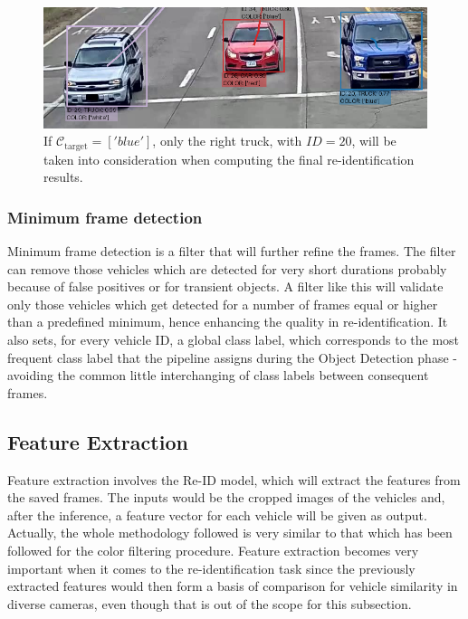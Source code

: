 \begin{figure}[H]
    \centering
    \includegraphics[width=1.0\textwidth]{images/ColorFiltering.png}
    \caption[Color Filtering]{If \(\mathcal{C}_{\text{target}} = ['blue']\), only the right truck, with \(ID = 20\), will be taken into consideration when computing the final re-identification results.}
    \label{fig:ColorFiltering}
\end{figure}

\subsubsection{Minimum frame detection}
Minimum frame detection is a filter that will further refine the frames. The filter can remove those vehicles which are detected for very short durations probably because of false positives or for transient objects. A filter like this will validate only those vehicles which get detected for a number of frames equal or higher than a predefined minimum, hence enhancing the quality in re-identification. It also sets, for every vehicle ID, a global class label, which corresponds to the most frequent class label that the pipeline assigns during the Object Detection phase - avoiding the common little interchanging of class labels between consequent frames.

\subsection{Feature Extraction}
Feature extraction involves the Re-ID model, which will extract the features from the saved frames. The inputs would be the cropped images of the vehicles and, after the inference, a feature vector for each vehicle will be given as output. Actually, the whole methodology followed is very similar to that which has been followed for the color filtering procedure. Feature extraction becomes very important when it comes to the re-identification task since the previously extracted features would then form a basis of comparison for vehicle similarity in diverse cameras, even though that is out of the scope for this subsection.

